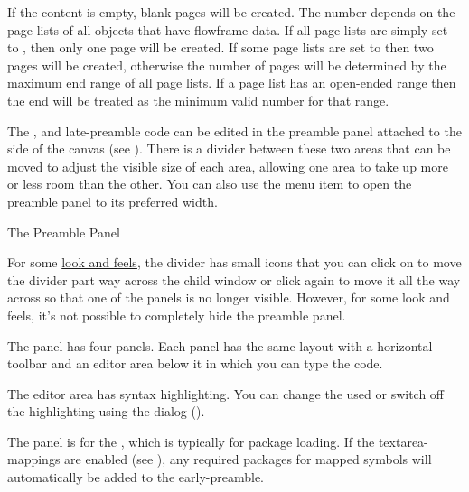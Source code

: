 If the  content is empty,
blank pages will be created. The number depends on the page lists of
all objects that have \gls{flowframe} data. If all page lists are
simply set to , then only one page will be created. If some
page lists are set to  then two pages will be created,
otherwise the number of pages will be determined by the maximum end
range of all page lists.  If a page list has an open-ended range
then the end will be treated as the minimum valid number for that
range.


The ,  and
\gls{late-preamble} code can be edited in the
\gls{preamble} panel attached to the side of the
\gls{canvas} (see ). There is a
divider between these two areas that can be moved to adjust the
visible size of each area, allowing one area to take up more or less
room than the other. You can also use the 
menu item to open the preamble panel to its preferred width.

{}
{The Preamble Panel}

For some \hyperref[sec:lookandfeel]{look and feels}, the
divider has small icons that you can click on to move the divider
part way across the child window or click again to move it all the
way across so that one of the panels is no longer visible. However,
for some look and feels, it's not possible to completely hide the
preamble panel.


The  panel has four panels.
Each panel has the same layout with a horizontal toolbar and an
editor area below it in which you can type the code. 

The editor area has syntax highlighting. You can change the
 used or switch off the highlighting using the
 dialog ().


The  panel is for the 
, which is typically for package
loading. If the \glspl{textarea-mapping} are enabled (see
), any
required packages for mapped symbols will automatically be
added to the \gls{early-preamble}.

